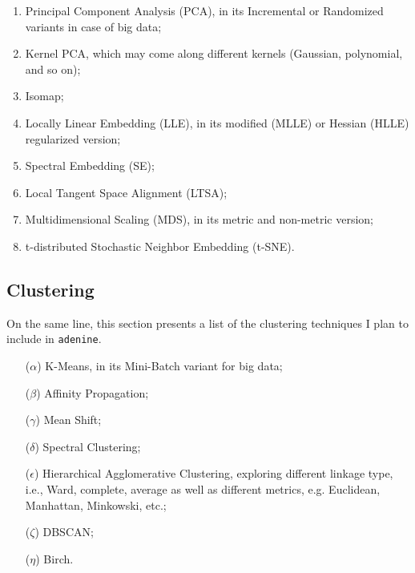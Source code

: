 \documentclass[paper=a4, fontsize=10pt]{scrartcl} %
\numberwithin{equation}{section} %
\numberwithin{figure}{section} %
\numberwithin{table}{section} %
\newcommand{\adenine}{{\tt adenine}\xspace}
\begin{document}
\begin{enumerate}[label=(\alph*)]

	\item Principal Component Analysis (PCA), in its Incremental or Randomized variants
	in case of big data;

	\item Kernel PCA, which may come along different kernels (Gaussian,
	polynomial, and so on);
	
	\item Isomap;

	\item Locally Linear Embedding (LLE), in its modified (MLLE) or Hessian 
	(HLLE) regularized version;

	\item Spectral Embedding (SE);

	\item Local Tangent Space Alignment (LTSA);

	\item Multidimensional Scaling (MDS), in its metric and non-metric version;

	\item t-distributed Stochastic Neighbor Embedding (t-SNE).

\end{enumerate}

\subsection{Clustering}

On the same line, this section presents a list of the clustering techniques I 
plan to include in \adenine.

\begin{enumerate}

	\item [($\alpha$)] K-Means, in its Mini-Batch variant for big data;

	\item [($\beta$)] Affinity Propagation;

	\item [($\gamma$)] Mean Shift;

	\item [($\delta$)] Spectral Clustering;

	\item [($\epsilon$)] Hierarchical Agglomerative Clustering, exploring
	different linkage type, i.e., Ward, complete, average as well as different 
	metrics, e.g. Euclidean, Manhattan, Minkowski, etc.;

	\item [($\zeta$)] DBSCAN;

	\item [($\eta$)] Birch.

\end{enumerate}
\end{document}
